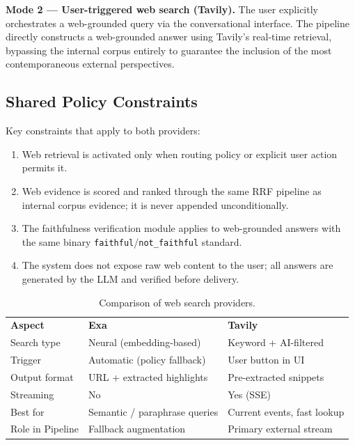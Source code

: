 \documentclass[12pt, a4paper]{article}
\begin{document}
\textbf{Mode 2 --- User-triggered web search (Tavily).}
The user explicitly orchestrates a web-grounded query via the conversational interface.
The pipeline directly constructs a web-grounded answer using Tavily's real-time
retrieval, bypassing the internal corpus entirely to guarantee the inclusion of
the most contemporaneous external perspectives.

\subsection{Shared Policy Constraints}

Key constraints that apply to both providers:

\begin{enumerate}[leftmargin=1.8em, itemsep=0.2em]
  \item Web retrieval is activated only when routing policy or explicit user
        action permits it.
  \item Web evidence is scored and ranked through the same RRF pipeline as
        internal corpus evidence; it is never appended unconditionally.
  \item The faithfulness verification module applies to web-grounded answers
        with the same binary \texttt{faithful}/\texttt{not\_faithful} standard.
  \item The system does not expose raw web content to the user; all answers
        are generated by the LLM and verified before delivery.
\end{enumerate}

\begin{table}[H]
  \centering
  \caption{Comparison of web search providers.}
  \label{tab:webproviders}
  \begin{tabularx}{\linewidth}{L{2.5cm} L{4.5cm} Y}
    \color{white}\textbf{Aspect} &
    \color{white}\textbf{Exa} &
    \color{white}\textbf{Tavily} \\
    Search type    & Neural (embedding-based)      & Keyword + AI-filtered \\
    Trigger        & Automatic (policy fallback)   & User button in UI \\
    Output format  & URL + extracted highlights    & Pre-extracted snippets \\
    Streaming      & No                            & Yes (SSE) \\
    Best for       & Semantic / paraphrase queries & Current events, fast lookup \\
    Role in Pipeline & Fallback augmentation         & Primary external stream \\
  \end{tabularx}
\end{table}
\end{document}
